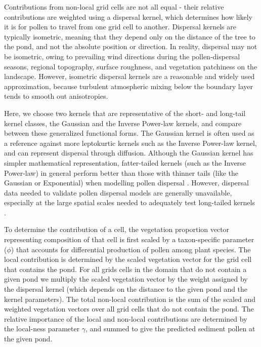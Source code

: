 \documentclass[12pt]{article}
\begin{document}
Contributions from non-local grid cells are not all equal - their
relative contributions are weighted using a dispersal kernel, which
determines how likely it is for pollen to travel from one grid cell to
another. Dispersal kernels are typically isometric, meaning that they
depend only on the distance of the tree to the pond, and not the
absolute position or direction. In reality, dispersal may not be
isometric, owing to prevailing wind directions during the
pollen-dispersal seasons, regional topography, surface roughness, and
vegetation patchiness on the landscape. However, isometric dispersal
kernels are a reasonable and widely used approximation, because
turbulent atmospheric mixing below the boundary layer tends to smooth
out anisotropies.


Here, we choose two kernels that are representative of the short- and
long-tail kernel classes, the Gaussian and the Inverse Power-law
kernels, and compare between these generalized functional forms. The
Gaussian kernel is often used as a reference against more leptokurtic
kernels such as the Inverse Power-law kernel, and can represent
dispersal through diffusion. Although the Gaussian kernel has simpler
mathematical representation, fatter-tailed kernels (such as the
Inverse Power-law) in general perform better than those with thinner
tails (like the Gaussian or Exponential) when modelling pollen
dispersal \citep{devaux2007modelling, austerlitz2004using}. However,
dispersal data needed to validate pollen dispersal models are
generally unavailable, especially at the large spatial scales needed
to adequately test long-tailed kernels \citep{clobert2012dispersal}.


To determine the contribution of a cell, the vegetation proportion
vector representing composition of that cell is first scaled by a
taxon-specific parameter ($\phi$) that accounts for differential
production of pollen among plant species. The local contribution is
determined by the scaled vegetation vector for the grid cell that
contains the pond. For all grids cells in the domain that do not
contain a given pond we multiply the scaled vegetation vector by the
weight assigned by the dispersal kernel (which depends on the distance
to the given pond and the kernel parameters). The total non-local
contribution is the sum of the scaled and weighted vegetation vectors
over all grid cells that do not contain the pond. The relative
importance of the local and non-local contributions are determined by
the local-ness parameter $\gamma$, and summed to give the predicted
sediment pollen at the given pond.
\end{document}

